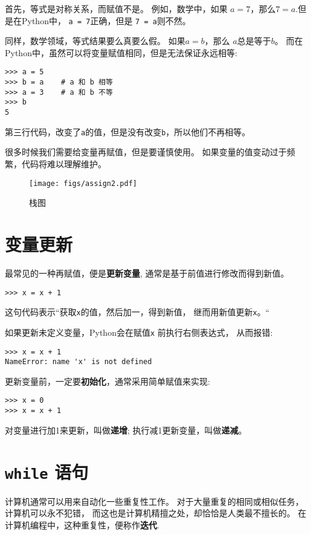 \documentclass[10pt]{book}
\begin{document}
首先，等式是对称关系，而赋值不是。
例如，数学中，如果 $a=7$，那么$7=a$.但是在Python中，
{\tt a = 7}正确，但是 {\tt 7 = a}则不然。

同样，数学领域，等式结果要么真要么假。
如果$a=b$，那么 $a$总是等于$b$。
而在Python中，虽然可以将变量赋值相同，但是无法保证永远相等:

\begin{verbatim}
>>> a = 5
>>> b = a    # a 和 b 相等
>>> a = 3    # a 和 b 不等
>>> b
5
\end{verbatim}
%
第三行代码，改变了{\tt a}的值，但是没有改变{\tt b}，所以他们不再相等。

很多时候我们需要给变量再赋值，但是要谨慎使用。
如果变量的值变动过于频繁，代码将难以理解维护。

\begin{figure}
\centerline
{\texttt{[image: figs/assign2.pdf]}}
\caption{栈图}
\label{fig.assign2}
\end{figure}



\section{变量更新}
\label{update}


最常见的一种再赋值，便是{\bf 更新变量},
通常是基于前值进行修改而得到新值。

\begin{verbatim}
>>> x = x + 1
\end{verbatim}
%
这句代码表示``获取{\tt x}的值，然后加一，得到新值，
继而用新值更新{\tt x}。“

如果更新未定义变量，Python会在赋值{\tt x} 前执行右侧表达式，
从而报错:

\begin{verbatim}
>>> x = x + 1
NameError: name 'x' is not defined
\end{verbatim}
%
更新变量前，一定要{\bf 初始化}，通常采用简单赋值来实现:

\begin{verbatim}
>>> x = 0
>>> x = x + 1
\end{verbatim}
%
对变量进行加1来更新，叫做{\bf 递增};
执行减1更新变量，叫做{\bf 递减}。


\section{{\tt while} 语句}
计算机通常可以用来自动化一些重复性工作。
对于大量重复的相同或相似任务，计算机可以永不犯错，
而这也是计算机精擅之处，却恰恰是人类最不擅长的。
在计算机编程中，这种重复性，便称作{\bf 迭代}.
\end{document}
